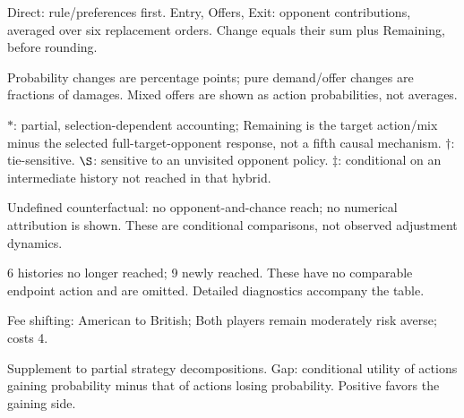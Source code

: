 \documentclass[10pt]{article}
\begin{document}
{\footnotesize Direct: rule/preferences first. Entry, Offers, Exit: opponent contributions, averaged over six replacement orders. Change equals their sum plus Remaining, before rounding.\par
Probability changes are percentage points; pure demand/offer changes are fractions of damages. Mixed offers are shown as action probabilities, not averages.\par
$*$: partial, selection-dependent accounting; Remaining is the target action/mix minus the selected full-target-opponent response, not a fifth causal mechanism. $\dagger$: tie-sensitive. $\S$: sensitive to an unvisited opponent policy. $\ddagger$: conditional on an intermediate history not reached in that hybrid.\par
Undefined counterfactual: no opponent-and-chance reach; no numerical attribution is shown. These are conditional comparisons, not observed adjustment dynamics.\par
6 histories no longer reached; 9 newly reached. These have no comparable endpoint action and are omitted. Detailed diagnostics accompany the table.}\par
{}\par
Fee shifting: American to British; Both players remain moderately risk averse; costs 4.\par
{\small Supplement to partial strategy decompositions. Gap: conditional utility of actions gaining probability minus that of actions losing probability. Positive favors the gaining side.}\par
\end{document}
